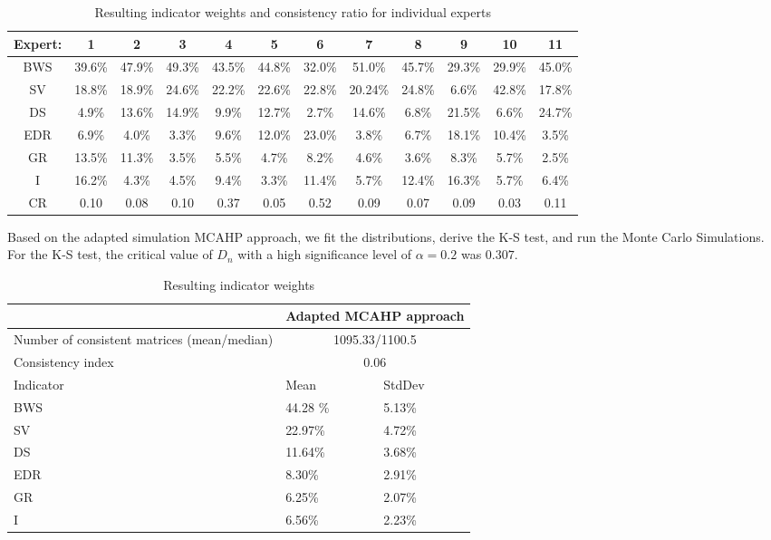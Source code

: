 \documentclass[a4paper]{article}
\begin{document}
\begin{table}[t h b]
\caption{Resulting indicator weights and consistency ratio for individual experts}
\centering
\begin{tabular} {c c c c c c c c c c c c} \\ 
\toprule
Expert: & 1 & 2 & 3 & 4 & 5 & 6 & 7 & 8 & 9 & 10 & 11\\
\midrule 	
BWS	& 39.6\% & 47.9\% & 49.3\% & 43.5\% & 44.8\% & 32.0\% & 51.0\% & 45.7\% & 29.3\% & 29.9\% & 45.0\% \\
SV	& 18.8\% & 18.9\% & 24.6\% & 22.2\% & 22.6\% & 22.8\% & 20.24\% & 24.8\% & 6.6\% & 42.8\% & 17.8\% \\
DS	& 4.9\% & 13.6\% & 14.9\% & 9.9\% & 12.7\% & 2.7\% & 14.6\% & 6.8\% & 21.5\% & 6.6\% & 24.7\%\\
EDR	& 6.9\% & 4.0\% & 3.3\% & 9.6\% & 12.0\% & 23.0\% & 3.8\% & 6.7\% & 18.1\% & 10.4\% & 3.5\%\\
GR	& 13.5\% & 11.3\% & 3.5\% & 5.5\% & 4.7\% & 8.2\% & 4.6\% & 3.6\% & 8.3\% & 5.7\% & 2.5\% \\
I	& 16.2\% & 4.3\% & 4.5\% & 9.4\% & 3.3\% & 11.4\% & 5.7\% & 12.4\% & 16.3\% & 5.7\% & 6.4\%\\
\midrule 	
CR	& 0.10 & 0.08 & 0.10 & 0.37 & 0.05 & 0.52 & 0.09 & 0.07 & 0.09 & 0.03 & 0.11\\
\bottomrule
\end{tabular}
\end{table} 


Based on the adapted simulation MCAHP approach, we fit the distributions, derive the K-S test, and run the Monte Carlo Simulations. 
 For the K-S test, the critical value of $D_n$ with a high significance level of $\alpha=0.2$ was $0.307$.


\begin{table}
\caption{Resulting indicator weights}
\centering
\begin{tabular} {p{4cm} l l} \\ 
\toprule
	 &	\multicolumn{2}{l}{Adapted MCAHP approach} \\
\midrule 	
Number of consistent matrices (mean/median) & \multicolumn{2}{c}{1095.33/1100.5}\\
Consistency index							& \multicolumn{2}{c}{0.06}\\
Indicator									& Mean & StdDev\\
BWS											& 44.28 \% 	& 5.13\% \\
SV											& 22.97\% & 4.72\%\\
DS	& 11.64\% & 3.68\%\\
EDR	& 8.30\%  & 2.91\%\\	
GR 	& 6.25\%  & 2.07\%\\
I	& 6.56\%  & 2.23\%\\
\bottomrule
\end{tabular}
\end{table} 
\end{document}
